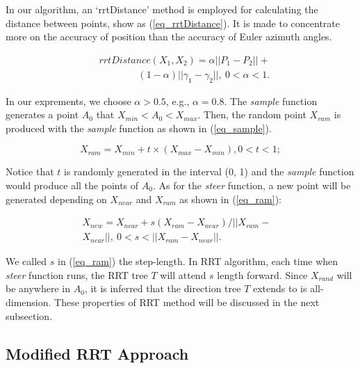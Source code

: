 \documentclass[letterpaper, 10 pt, conference]{ieeeconf}  %
\begin{document}
In our algorithm, an `rrtDistance' method is employed for calculating the distance between points, show as (\ref{eq_rrtDistance}). It is made to concentrate more on the accuracy of position than the accuracy of Euler azimuth angles.

 \begin{equation}
 \begin{array}{ll}
 &rrtDistance(X_{1},X_{2})=\alpha ||P_{1}-P_{2}|| + \\
& \qquad\qquad (1-\alpha) ||\gamma_{1}-\gamma_{2}||, \ 0 < \alpha < 1.
 \end{array}
 \label{eq_rrtDistance}
 \end{equation}

 In our exprements, we choose $\alpha > 0.5$, e.g., $\alpha = 0.8$. The \textit{sample} function generates a point $A_{0}$ that $X_{min} < A_{0} < X_{max}$. Then, the random point $X_{ram}$ is produced with the \textit{sample} function as shown in  (\ref{eq_sample}).

 \begin{equation}
 X_{ram} = X_{min} + t \times (X_{max}-X_{min}), 0<t<1;
  \label{eq_sample}
 \end{equation}

Notice that $t$ is randomly generated in the interval (0, 1) and the \textit{sample} function would produce all the points of $A_{0}$. As for the \textit{steer} function, a new point will be generated depending on $X_{near}$ and $X_{ram}$ as shown in (\ref{eq_ram}):

\begin{equation} \label{eq_ram}
 \begin{array}{rr}
 X_{new} = X_{near} + s(X_{ram}-X_{near})/||X_{ram}-&\\
 X_{near}||,\ 0<s<||X_{ram}-X_{near}||.&
 \end{array}
 \end{equation}

 We called $s$ in (\ref{eq_ram}) the step-length. In RRT algorithm, each time when \textit{steer} function runs, the RRT tree $T$ will attend $s$ length forward. Since $X_{rand}$ will be anywhere in $A_{0}$, it is inferred that the direction tree $T$ extends to is all-dimension. These properties of RRT method will be discussed in the next subsection.

\subsection{Modified RRT Approach}
\end{document}
